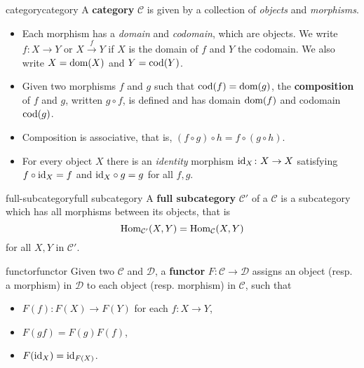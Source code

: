 \begin{topic}{category}{category}
    A \textbf{category} $\mathcal{C}$ is given by a collection of \textit{objects} and \textit{morphisms}.
    \begin{itemize}
        \item Each morphism has a \textit{domain} and \textit{codomain}, which are objects. We write $f \colon X \to Y$ or $X \overset{f}{\to} Y$ if $X$ is the domain of $f$ and $Y$ the codomain. We also write $X = \textup{dom}(X)$ and $Y = \textup{cod}(Y)$.
        
        \item Given two morphisms $f$ and $g$ such that $\textup{cod}(f) = \textup{dom}(g)$, the \textbf{composition} of $f$ and $g$, written $g \circ f$, is defined and has domain $\textup{dom}(f)$ and codomain $\textup{cod}(g)$.
        
        \item Composition is associative, that is, $(f \circ g) \circ h = f \circ (g \circ h)$.
        
        \item For every object $X$ there is an \textit{identity} morphism $\textup{id}_X \colon X \to X$ satisfying $f \circ \textup{id}_X = f$ and $\textup{id}_X \circ g = g$ for all $f, g$.
    \end{itemize}
\end{topic}

\begin{topic}{full-subcategory}{full subcategory}
    A \textbf{full subcategory} $\mathcal{C}'$ of a  $\mathcal{C}$ is a subcategory which has all morphisms between its objects, that is
    \[ \operatorname{Hom}_{\mathcal{C}'}(X, Y) = \operatorname{Hom}_{\mathcal{C}}(X, Y) \]
    for all $X, Y$ in $\mathcal{C}'$.
\end{topic}

\begin{topic}{functor}{functor}
    Given two  $\mathcal{C}$ and $\mathcal{D}$, a \textbf{functor} $F \colon \mathcal{C} \to \mathcal{D}$ assigns an object (resp. a morphism) in $\mathcal{D}$ to each object (resp. morphism) in $\mathcal{C}$, such that
    \begin{itemize}
        \item $F(f) \colon F(X) \to F(Y)$ for each $f \colon X \to Y$,
        \item $F(gf) = F(g) F(f)$,
        \item $F(\textup{id}_X) = \textup{id}_{F(X)}$.
    \end{itemize}
\end{topic}

